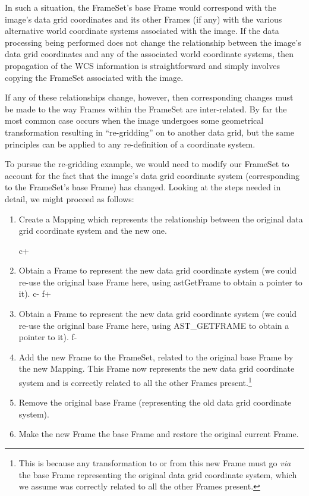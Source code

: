 \documentclass[twoside,11pt]{article}
\begin{document}
In such a situation, the FrameSet's base Frame would correspond with
the image's data grid coordinates and its other Frames (if any) with
the various alternative world coordinate systems associated with the
image.  If the data processing being performed does not change the
relationship between the image's data grid coordinates and any of the
associated world coordinate systems, then propagation of the WCS
information is straightforward and simply involves copying the
FrameSet associated with the image.

If any of these relationships change, however, then corresponding
changes must be made to the way Frames within the FrameSet are
inter-related. By far the most common case occurs when the image
undergoes some geometrical transformation resulting in ``re-gridding''
on to another data grid, but the same principles can be applied to any
re-definition of a coordinate system.

To pursue the re-gridding example, we would need to modify our
FrameSet to account for the fact that the image's data grid coordinate
system (corresponding to the FrameSet's base Frame) has
changed. Looking at the steps needed in detail, we might proceed as
follows:

\begin{enumerate}
\item Create a Mapping which represents the relationship between the
original data grid coordinate system and the new one.

c+
\item Obtain a Frame to represent the new data grid coordinate system
(we could re-use the original base Frame here, using astGetFrame to
obtain a pointer to it).
c-
f+
\item Obtain a Frame to represent the new data grid coordinate system
(we could re-use the original base Frame here, using AST\_GETFRAME to
obtain a pointer to it).
f-

\item Add the new Frame to the FrameSet, related to the original base
Frame by the new Mapping. This Frame now represents the new data grid
coordinate system and is correctly related to all the other Frames
present.\footnote{This is because any transformation to or from this
new Frame must go {\em{via}} the base Frame representing the original
data grid coordinate system, which we assume was correctly related to
all the other Frames present.}

\item Remove the original base Frame (representing the old data grid
coordinate system).

\item Make the new Frame the base Frame and restore the original
current Frame.
\end{enumerate}
\end{document}
